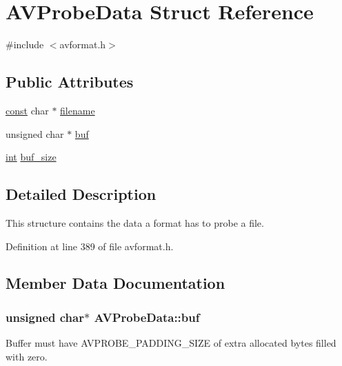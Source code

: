 \hypertarget{struct_a_v_probe_data}{}\section{A\+V\+Probe\+Data Struct Reference}
\label{struct_a_v_probe_data}


{\ttfamily \#include $<$avformat.\+h$>$}

\subsection*{Public Attributes}
\begin{DoxyCompactItemize}
\item 
\hyperlink{getopt1_8c_a2c212835823e3c54a8ab6d95c652660e}{const} char $\ast$ \hyperlink{struct_a_v_probe_data_a0e8504127aff8af25cc9f3c6400b9651}{filename}
\item 
unsigned char $\ast$ \hyperlink{struct_a_v_probe_data_a814cca49dda3f578ebb32d4b2f74368a}{buf}
\item 
\hyperlink{xmltok_8h_a5a0d4a5641ce434f1d23533f2b2e6653}{int} \hyperlink{struct_a_v_probe_data_a30309e4de25c1a411c635eab767e1e53}{buf\+\_\+size}
\end{DoxyCompactItemize}


\subsection{Detailed Description}
This structure contains the data a format has to probe a file. 

Definition at line 389 of file avformat.\+h.



\subsection{Member Data Documentation}
\subsubsection[{\texorpdfstring{buf}{buf}}]{\setlength{\rightskip}{0pt plus 5cm}unsigned char$\ast$ A\+V\+Probe\+Data\+::buf}\hypertarget{struct_a_v_probe_data_a814cca49dda3f578ebb32d4b2f74368a}{}\label{struct_a_v_probe_data_a814cca49dda3f578ebb32d4b2f74368a}
Buffer must have A\+V\+P\+R\+O\+B\+E\+\_\+\+P\+A\+D\+D\+I\+N\+G\+\_\+\+S\+I\+ZE of extra allocated bytes filled with zero. 

